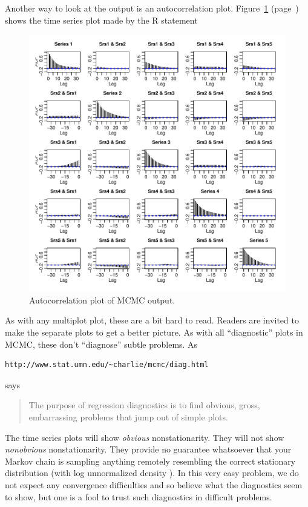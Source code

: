 \documentclass[12pt]{article}
\begin{document}
Another way to look at the output is an autocorrelation plot.
Figure~\ref{fig:fig2} (page~\pageref{fig:fig2})
shows the time series plot made by the R statement
\begin{Schunk}
\end{Schunk}
\begin{figure}
\begin{center}
\includegraphics{sweaveTemplate-fig2}
\end{center}
\caption{Autocorrelation plot of MCMC output.}
\label{fig:fig2}
\end{figure}

As with any multiplot plot, these are a bit hard to read.  Readers are
invited to make the separate plots to get a better picture.
As with all ``diagnostic'' plots in MCMC, these don't ``diagnose''
subtle problems.  As
\begin{verbatim}
http://www.stat.umn.edu/~charlie/mcmc/diag.html
\end{verbatim}
says
\begin{quotation}
The purpose of regression diagnostics is to find obvious, gross,
embarrassing problems that jump out of simple plots.
\end{quotation}
The time series plots will show \emph{obvious} nonstationarity.
They will not show \emph{nonobvious} nonstationarity.  They
provide no guarantee whatsoever that your Markov chain is sampling
anything remotely resembling the correct stationary distribution
(with log unnormalized density \verb@lupost@).  In this very easy
problem, we do not expect any convergence difficulties and so believe
what the diagnostics seem to show, but one is a fool to trust such
diagnostics in difficult problems.
\end{document}

